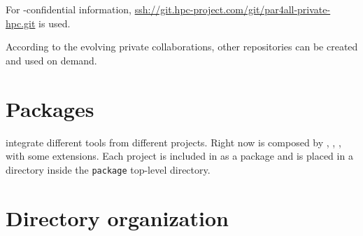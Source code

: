 \documentclass[a4paper]{article}
\begin{document}
For \Ahpcp-confidential information,
\url{ssh://git.hpc-project.com/git/par4all-private-hpc.git} is used.

According to the evolving private collaborations, other repositories can
be created and used on demand.


\section{Packages}
\label{sec:packages}

\Apfa integrate different tools from different projects. Right now \Apfa
is composed by \Apips, \Apipsgfc, \Apolylib, with some extensions. Each
project is included in \Apfa as a package and is placed in a directory
inside the \texttt{package} top-level directory.


\section{Directory organization}
\label{sec:direct-organ}
\end{document}
